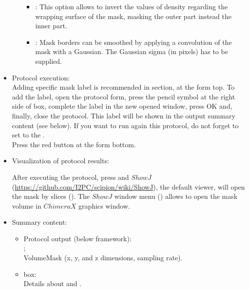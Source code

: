 \begin{itemize}
\begin{itemize}
\begin{itemize}
                \item {}: This option allows to invert the values of density regarding the wrapping surface of the mask, masking the outer part instead the inner part.
                \item {}: Mask borders can be smoothed by applying a convolution of the mask with a Gaussian. The Gaussian sigma (in pixels) has to be supplied.
                \end{itemize}

    \end{itemize}
 
 \item Protocol execution:\\
 Adding specific mask label is recommended in  section, at the form top. To add the label, open the protocol form, press the pencil symbol at the right side of  box, complete the label in the new opened window, press OK and, finally, close the protocol. This label will be shown in the output summary content (see below). If you want to run again this protocol, do not forget to set to  the .\\
  Press the  red button at the form bottom.
  
  \item Visualization of protocol results:
  
  After executing the protocol, press  and $ShowJ$ (\url{https://github.com/I2PC/scipion/wiki/ShowJ}), the default \scipion viewer, will open the mask by slices (). The $ShowJ$ window menu () allows to open the mask volume in $ChimeraX$ graphics window.

 \item Summary content:
  \begin{itemize}
     \item Protocol output (below \scipion framework):\\ ;\\ VolumeMask (x, y, and z dimensions, sampling rate).
     \item {} box:\\ Details about  and .
    \end{itemize}
    
 \end{itemize}
